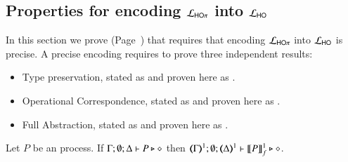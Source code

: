 
\subsection{Properties for encoding $\mathcal{L}_{\mathsf{HO}\pi}$ into $\mathcal{L}_{\mathsf{HO}}$}
\label{app:enc_HOp_to_HO}


In this section we prove  (Page~\pageref{f:enc:hopitoho})
that requires that encoding
$\mathcal{L}_{\mathsf{HO}\pi}$ into $\mathcal{L}_{\mathsf{HO}}$ is precise.
A precise encoding requires to prove three independent results:
\begin{itemize}
	\item	Type preservation, stated as 
	and proven here as  .
	\item	Operational Correspondence, 
	stated as  and proven here as
	  .
	\item	Full Abstraction, stated as  and proven here as .
\end{itemize}


\begin{proposition}
	\label{app:prop:typepres_HOp_to_HO}
	Let $P$ be an \HOp process.
	If $\Gamma; \emptyset; \Delta \vdash P \triangleright \diamond$ then 
	$\mapt{\Gamma}^{1}; \emptyset; \mapt{\Delta}^{1} \proves \pmapp{P}{1}{f} \hastype \Proc$. 
\end{proposition}

